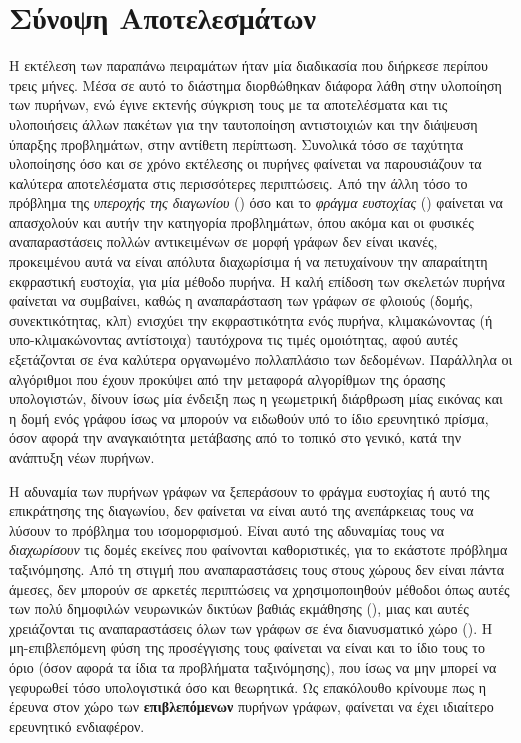 \section{Σύνοψη Αποτελεσμάτων}
Η εκτέλεση των παραπάνω πειραμάτων ήταν μία διαδικασία που διήρκεσε περίπου τρεις μήνες.
Μέσα σε αυτό το διάστημα διορθώθηκαν διάφορα λάθη στην υλοποίηση των πυρήνων, ενώ έγινε εκτενής σύγκριση τους με τα αποτελέσματα και τις υλοποιήσεις άλλων πακέτων για την ταυτοποίηση αντιστοιχιών και την διάψευση ύπαρξης προβλημάτων, στην αντίθετη περίπτωση.
Συνολικά τόσο σε ταχύτητα υλοποίησης όσο και σε χρόνο εκτέλεσης οι πυρήνες  φαίνεται να παρουσιάζουν τα καλύτερα αποτελέσματα στις περισσότερες περιπτώσεις.
Από την άλλη τόσο το πρόβλημα της \textit{υπεροχής της διαγωνίου} () όσο και το \textit{φράγμα ευστοχίας} () φαίνεται να απασχολούν και αυτήν την κατηγορία προβλημάτων, όπου ακόμα και οι φυσικές αναπαραστάσεις πολλών αντικειμένων σε μορφή γράφων δεν είναι ικανές, προκειμένου αυτά να είναι απόλυτα διαχωρίσιμα ή να πετυχαίνουν την απαραίτητη εκφραστική ευστοχία, για μία μέθοδο πυρήνα.
Η καλή επίδοση των σκελετών πυρήνα φαίνεται να συμβαίνει, καθώς η αναπαράσταση των γράφων σε φλοιούς (δομής, συνεκτικότητας, κλπ) ενισχύει την εκφραστικότητα ενός πυρήνα, κλιμακώνοντας (ή υπο-κλιμακώνοντας αντίστοιχα) ταυτόχρονα τις τιμές ομοιότητας, αφού αυτές εξετάζονται σε ένα καλύτερα οργανωμένο πολλαπλάσιο των δεδομένων.
Παράλληλα οι αλγόριθμοι  που έχουν προκύψει από την μεταφορά αλγορίθμων της όρασης υπολογιστών, δίνουν ίσως μία ένδειξη πως η γεωμετρική διάρθρωση μίας εικόνας και η δομή ενός γράφου ίσως να μπορούν να ειδωθούν υπό το ίδιο ερευνητικό πρίσμα, όσον αφορά την αναγκαιότητα μετάβασης από το τοπικό στο γενικό, κατά την ανάπτυξη νέων πυρήνων.\par
Η αδυναμία των πυρήνων γράφων να ξεπεράσουν το φράγμα ευστοχίας ή αυτό της επικράτησης της διαγωνίου, δεν φαίνεται να είναι αυτό της ανεπάρκειας τους να λύσουν το πρόβλημα του ισομορφισμού.
Είναι αυτό της αδυναμίας τους να \textit{διαχωρίσουν} τις δομές εκείνες που φαίνονται καθοριστικές, για το εκάστοτε πρόβλημα ταξινόμησης.
Από τη στιγμή που αναπαραστάσεις τους στους χώρους  δεν είναι πάντα άμεσες, δεν μπορούν σε αρκετές περιπτώσεις  να χρησιμοποιηθούν μέθοδοι όπως αυτές των πολύ δημοφιλών νευρωνικών δικτύων βαθιάς εκμάθησης (), μιας και αυτές χρειάζονται τις αναπαραστάσεις όλων των γράφων σε ένα διανυσματικό χώρο ().
Η μη-επιβλεπόμενη φύση της προσέγγισης τους φαίνεται να είναι και το ίδιο τους το όριο (όσον αφορά τα ίδια τα προβλήματα ταξινόμησης), που ίσως να μην μπορεί να γεφυρωθεί τόσο υπολογιστικά όσο και θεωρητικά.
Ως επακόλουθο κρίνουμε πως η έρευνα στον χώρο των \textbf{επιβλεπόμενων} πυρήνων γράφων, φαίνεται να έχει ιδιαίτερο ερευνητικό ενδιαφέρον.
